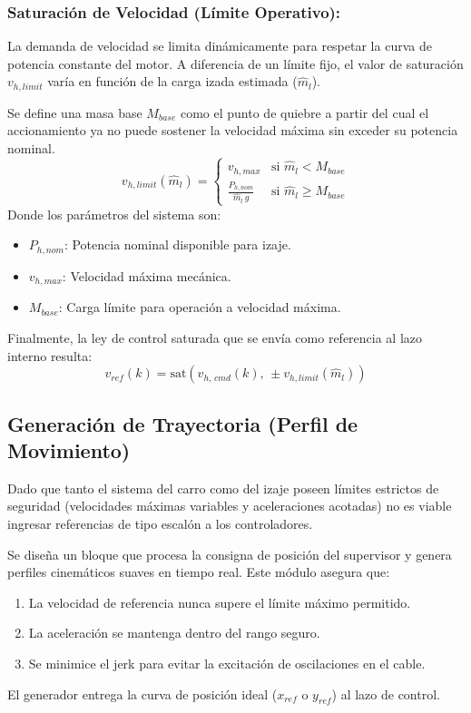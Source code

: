 \documentclass[11pt]{article}                                    %
\begin{document}
\subsubsection{Saturación de Velocidad (Límite Operativo):}
La demanda de velocidad se limita dinámicamente para respetar la curva de potencia constante del motor. A diferencia de un límite fijo, el valor de saturación $v_{h,limit}$ varía en función de la carga izada estimada ($\hat{m}_l$).

Se define una masa base $M_{base}$ como el punto de quiebre a partir del cual el accionamiento ya no puede sostener la velocidad máxima sin exceder su potencia nominal.
\begin{equation}
    v_{h,limit}(\hat{m}_l) = 
    \begin{cases} 
        v_{h,max} & \text{si } \hat{m}_l < M_{base} \\
        \frac{P_{h,nom}}{\hat{m}_l \, g} & \text{si } \hat{m}_l \ge M_{base}
    \end{cases}
\end{equation}
Donde los parámetros del sistema son:
\begin{itemize}
    \item $P_{h,nom}$: Potencia nominal disponible para izaje.
    \item $v_{h,max}$: Velocidad máxima mecánica.
    \item $M_{base}$: Carga límite para operación a velocidad máxima.
\end{itemize}
Finalmente, la ley de control saturada que se envía como referencia al lazo interno resulta:
\begin{equation}
    v_{ref}(k) = \text{sat}\left( v_{h,\, cmd}(k), \, \pm v_{h,limit}(\hat{m}_l) \right)
\end{equation}

\subsection{Generación de Trayectoria (Perfil de Movimiento)}
Dado que tanto el sistema del carro como del izaje poseen límites estrictos de seguridad (velocidades máximas variables y aceleraciones acotadas) no es viable ingresar referencias de tipo escalón a los controladores.

Se diseña un bloque que procesa la consigna de posición del supervisor y genera perfiles cinemáticos suaves en tiempo real. Este módulo asegura que:
\begin{enumerate}
    \item La velocidad de referencia nunca supere el límite máximo permitido.
    \item La aceleración se mantenga dentro del rango seguro.
    \item Se minimice el jerk para evitar la excitación de oscilaciones en el cable.
\end{enumerate}
El generador entrega la curva de posición ideal ($x_{ref}$ o $y_{ref}$) al lazo de control.
\end{document}

